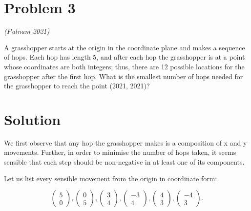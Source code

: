\documentclass[12pt, letterpaper]{article}
\begin{document}
\section*{Problem 3}
\textit{(Putnam 2021)}

A grasshopper starts at the origin in the coordinate plane and makes a sequence of hops. Each
hop has length 5, and after each hop the grasshopper is at a point whose coordinates are both
integers; thus, there are 12 possible locations for the grasshopper after the first hop. What is
the smallest number of hops needed for the grasshopper to reach the point (2021, 2021)?


\newpage

\section*{Solution}

We first observe that any hop the grasshopper makes is a composition of x and y movements. Further, in order to minimise the number of hops taken, it seems sensible that each step should be non-negative in at least one of its components.

Let us list every sensible movement from the origin in coordinate form:

\[ \begin{pmatrix}5\\0\end{pmatrix}, \begin{pmatrix}0\\5\end{pmatrix},
\begin{pmatrix}3\\4\end{pmatrix},
\begin{pmatrix}-3\\4\end{pmatrix},
\begin{pmatrix}4\\3\end{pmatrix},
\begin{pmatrix}-4\\3\end{pmatrix}. \]
\end{document}
